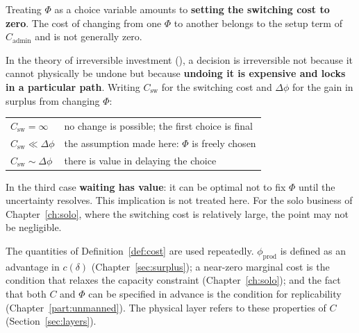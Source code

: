 \begin{remark}
\label{rem:switching-cost}
Treating $\Phi$ as a choice variable amounts to \textbf{setting the switching cost to zero}.
The cost of changing from one $\Phi$ to another belongs to the setup term of
$C_{\mathrm{admin}}$ and is not generally zero.

In the theory of irreversible investment (\cite{dixit1994}), a decision is irreversible not
because it cannot physically be undone but because \textbf{undoing it is expensive and locks
in a particular path}. Writing $C_{\mathrm{sw}}$ for the switching cost and $\Delta\phi$ for
the gain in surplus from changing $\Phi$:

\begin{center}
\begin{tabularx}{\textwidth}{@{}lX@{}}
\toprule
$C_{\mathrm{sw}} = \infty$ & no change is possible; the first choice is final \\
$C_{\mathrm{sw}} \ll \Delta\phi$ & the assumption made here: $\Phi$ is freely chosen \\
$C_{\mathrm{sw}} \sim \Delta\phi$ & there is value in delaying the choice \\
\bottomrule
\end{tabularx}
\label{tab:switching-cost-cases}
\end{center}
In the third case \textbf{waiting has value}: it can be optimal not to fix $\Phi$ until the
uncertainty resolves. This implication is not treated here. For the solo business of
Chapter~\ref{ch:solo}, where the switching cost is relatively large, the point may not be
negligible.
\end{remark}

\begin{remark}
\label{rem:cost-usage}
The quantities of Definition~\ref{def:cost} are used repeatedly.
$\phi_{\mathrm{prod}}$ is defined as an advantage in $c(\delta)$ (Chapter~\ref{sec:surplus});
a near-zero marginal cost is the condition that relaxes the capacity constraint
(Chapter~\ref{ch:solo}); and the fact that both $C$ and $\Phi$ can be specified in advance
is the condition for replicability (Chapter~\ref{part:unmanned}). The physical layer refers
to these properties of $C$ (Section~\ref{sec:layers}).
\end{remark}

